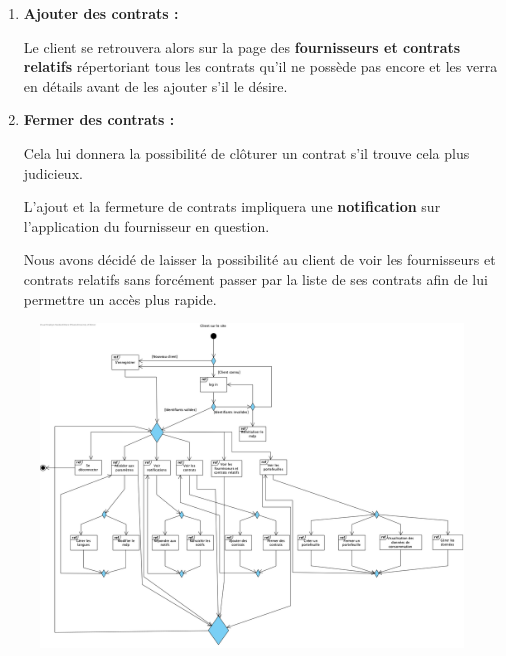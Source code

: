 \begin{enumerate}[-]
\item \textbf{Ajouter des contrats :}\newline

Le client se retrouvera alors sur la page des \textbf{fournisseurs et contrats relatifs} répertoriant tous les contrats qu’il ne possède pas encore et les verra en détails avant de les ajouter s’il le désire.

\item \textbf{Fermer des contrats :}\newline

Cela lui donnera la possibilité de clôturer un contrat s’il trouve cela plus judicieux.\newline

L’ajout et la fermeture de contrats impliquera une \textbf{notification} sur l’application du fournisseur en question.\newline

Nous avons décidé de laisser la possibilité au client de voir les fournisseurs et contrats relatifs sans forcément passer par la liste de ses contrats afin de lui permettre un accès plus rapide.
\end{enumerate}

\newpage

\begin{figure}[h]
\centering
\includegraphics[width = 1\textwidth]{Base/overview/img/overview-client.png}
\end{figure}

\newpage

